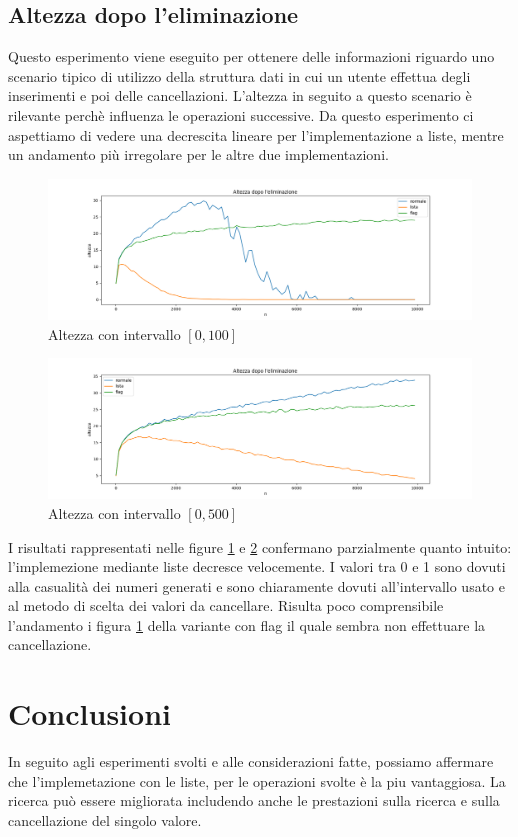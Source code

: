 \documentclass{article}
\begin{document}
\subsection{Altezza dopo l'eliminazione}
Questo esperimento viene eseguito per ottenere delle informazioni riguardo uno scenario tipico di utilizzo della struttura dati in cui un utente effettua degli inserimenti e poi delle cancellazioni. L'altezza in seguito a questo scenario è rilevante perchè influenza le operazioni successive.
Da questo esperimento ci aspettiamo di vedere una decrescita lineare per l'implementazione a liste, mentre un andamento più irregolare per le altre due implementazioni.
\begin{figure}[H]
\centering
  \centering
  \includegraphics[width=\linewidth]{img/height_after_graph_100_linear.png}
  \caption{Altezza con intervallo \( [0, 100] \) }
  \label{after100}
\end{figure}
\begin{figure}[H]
\centering
  \centering
  \includegraphics[width=\linewidth]{img/height_after_graph_500_linear.png}
  \caption{Altezza con intervallo \( [0, 500] \) }
  \label{after500}
\end{figure}
I risultati rappresentati nelle figure \ref{after100} e \ref{after500} confermano parzialmente quanto intuito: l'implemezione mediante liste decresce velocemente. I valori tra 0 e 1 sono dovuti alla casualità dei numeri generati e sono chiaramente dovuti all'intervallo usato e al metodo di scelta dei valori da cancellare.
Risulta poco comprensibile l'andamento i figura \ref{after100} della variante con flag il quale sembra non effettuare la cancellazione.
\section{Conclusioni}
In seguito agli esperimenti svolti e alle considerazioni fatte, possiamo affermare che l'implemetazione con le liste, per le operazioni svolte è la piu vantaggiosa. La ricerca può essere migliorata includendo anche le prestazioni sulla ricerca e sulla cancellazione del singolo valore.
\end{document}
